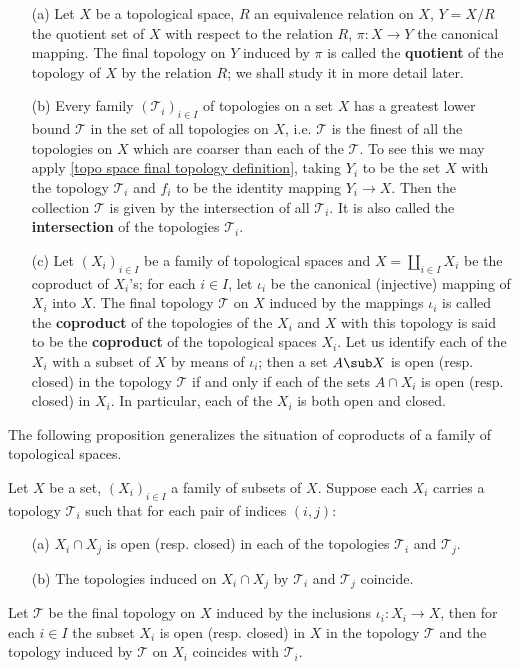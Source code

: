 \begin{example}
\mbox{}
\begin{enumerate}
\item[(a)] Let $X$ be a topological space, $R$ an equivalence relation on $X$, $Y=X/R$ the quotient set of $X$ with respect to the relation $R$, $\pi:X\to Y$ the canonical mapping. The final topology on $Y$ induced by $\pi$ is called the \textbf{quotient} of the topology of $X$ by the relation $R$; we shall study it in more detail later.
\item[(b)] Every family $(\mathcal{T}_i)_{i\in I}$ of topologies on a set $X$ has a greatest lower bound $\mathcal{T}$ in the set of all topologies on $X$, i.e. $\mathcal{T}$ is the finest of all the topologies on $X$ which are coarser than each of the $\mathcal{T}$. To see this we may apply \cref{topo space final topology definition}, taking $Y_i$ to be the set $X$ with the topology $\mathcal{T}_i$ and $f_i$ to be the identity mapping $Y_i\to X$. Then the collection $\mathcal{T}$ is given by the intersection of all $\mathcal{T}_i$. It is also called the \textbf{intersection} of the topologies $\mathcal{T}_i$.
\item[(c)] Let $(X_i)_{i\in I}$ be a family of topological spaces and $X=\coprod_{i\in I}X_i$ be the coproduct of $X_i$'s; for each $i\in I$, let $\iota_i$ be the canonical (injective) mapping of $X_i$ into $X$. The final topology $\mathcal{T}$ on $X$ induced by the mappings $\iota_i$ is called the \textbf{coproduct} of the topologies of the $X_i$ and $X$ with this topology is said to be the \textbf{coproduct} of the topological spaces $X_i$. Let us identify each of the $X_i$ with a subset of $X$ by means of $\iota_i$; then a set $A\sub X$ is open (resp. closed) in the topology $\mathcal{T}$ if and only if each of the sets $A\cap X_i$ is open (resp. closed) in $X_i$. In particular, each of the $X_i$ is both open and closed.
\end{enumerate}
\end{example}
The following proposition generalizes the situation of coproducts of a family of topological spaces.
\begin{proposition}\label{topo space pasting topology}
Let $X$ be a set, $(X_i)_{i\in I}$ a family of subsets of $X$. Suppose each $X_i$ carries a topology $\mathcal{T}_i$ such that for each pair of indices $(i,j)$:
\begin{itemize}
\item[(a)] $X_i\cap X_j$ is open (resp. closed) in each of the topologies $\mathcal{T}_i$ and $\mathcal{T}_j$.
\item[(b)] The topologies induced on $X_i\cap X_j$ by $\mathcal{T}_i$ and $\mathcal{T}_j$ coincide.
\end{itemize}
Let $\mathcal{T}$ be the final topology on $X$ induced by the inclusions $\iota_i:X_i\to X$, then for each $i\in I$ the subset $X_i$ is open (resp. closed) in $X$ in the topology $\mathcal{T}$ and the topology induced by $\mathcal{T}$ on $X_i$ coincides with $\mathcal{T}_i$.
\end{proposition}
